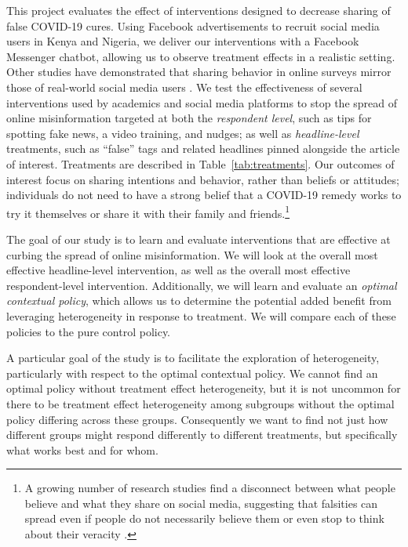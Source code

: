 \documentclass[letterpaper, 12pt, parskip=full,DIV=10]{scrartcl}
\begin{document}
This project evaluates the effect of interventions designed to decrease sharing of false COVID-19 cures. Using Facebook advertisements to recruit social media users in Kenya and Nigeria, we deliver our interventions with a Facebook Messenger chatbot, allowing us to observe treatment effects in a realistic setting. Other studies have demonstrated that sharing behavior in online surveys mirror those of real-world social media users \citep{mosleh2020self}. We test the effectiveness of several interventions used by academics and social media platforms to stop the spread of online misinformation targeted at both the \textit{respondent level}, such as tips for spotting fake news, a video training, and nudges; as well as \textit{headline-level} treatments, such as ``false'' tags and related headlines pinned alongside the article of interest. Treatments are described in Table~\ref{tab:treatments}. Our outcomes of interest focus on sharing intentions and behavior, rather than beliefs or attitudes; individuals do not need to have a strong belief that a COVID-19 remedy works to try it themselves or share it with their family and friends.\footnote{A growing number of research studies find a disconnect between what people believe and what they share on social media, suggesting that falsities can spread even if people do not necessarily believe them or even stop to think about their veracity \citep{pennycook_rand_2020}.}


The goal of our study is to learn and evaluate interventions that are effective at curbing the spread of online misinformation. We will look at the overall most effective headline-level intervention, as well as the overall most effective respondent-level intervention. Additionally, we will learn and evaluate an \textit{optimal contextual policy}, which allows us to determine the potential added benefit from leveraging heterogeneity in response to treatment. We will compare each of these policies to the pure control policy.

A particular goal of the study is to facilitate the exploration of heterogeneity, particularly with respect to the optimal contextual policy. We cannot find an optimal policy without treatment effect heterogeneity, but it is not uncommon for there to be treatment effect heterogeneity among subgroups without the optimal policy differing across these groups. Consequently we want to find not just how different groups might respond differently to different treatments, but specifically what works best and for whom. 
\end{document}
